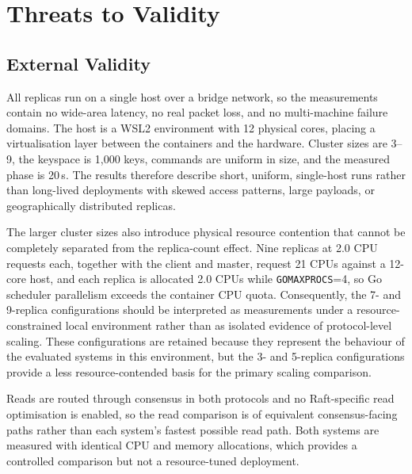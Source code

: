 \section{Threats to Validity}

\label{sec:threats}

\subsection{External Validity}

All replicas run on a single host over a bridge network, so the measurements
contain no wide-area latency, no real packet loss, and no multi-machine
failure domains. The host is a WSL2 environment with 12 physical cores,
placing a virtualisation layer between the containers and the hardware.
Cluster sizes are 3--9, the keyspace is 1{,}000 keys, commands are uniform
in size, and the measured phase is 20\,s. The results therefore describe
short, uniform, single-host runs rather than long-lived deployments with
skewed access patterns, large payloads, or geographically distributed
replicas.

The larger cluster sizes also introduce physical resource contention that
cannot be completely separated from the replica-count effect. Nine
replicas at 2.0 CPU requests each, together with the client and master,
request 21 CPUs against a 12-core host, and each replica is allocated 2.0
CPUs while \texttt{GOMAXPROCS}=4, so Go scheduler parallelism exceeds the
container CPU quota. Consequently, the 7- and 9-replica
configurations should be interpreted as measurements under a
resource-constrained local environment rather than as isolated evidence of
protocol-level scaling. These configurations are retained because they
represent the behaviour of the evaluated systems in this environment, but
the 3- and 5-replica configurations provide a less resource-contended basis
for the primary scaling comparison.

Reads are routed through consensus in both protocols and no Raft-specific
read optimisation is enabled, so the read comparison is of equivalent
consensus-facing paths rather than each system's fastest possible read path.
Both systems are measured with identical CPU and memory allocations, which
provides a controlled comparison but not a resource-tuned deployment.

